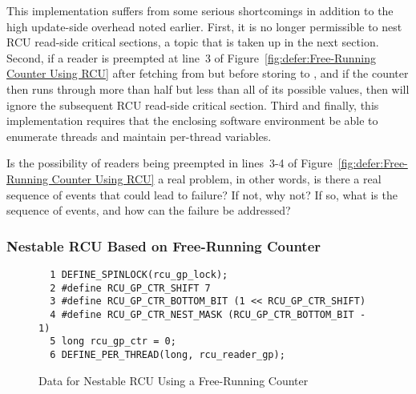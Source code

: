 This implementation suffers from some serious shortcomings in
addition to the high update-side overhead noted earlier.
First, it is no longer permissible to nest RCU read-side critical
sections, a topic that is taken up in the next section.
Second, if a reader is preempted at line~3 of
Figure~\ref{fig:defer:Free-Running Counter Using RCU} after fetching from
 but before storing to ,
and if the  counter then runs through more than half
but less than all of its possible values, then 
will ignore the subsequent RCU read-side critical section.
Third and finally, this implementation requires that the enclosing software
environment be able to enumerate threads and maintain per-thread
variables.

\QuickQuiz{}
	Is the possibility of readers being preempted in
	lines~3-4 of Figure~\ref{fig:defer:Free-Running Counter Using RCU}
	a real problem, in other words, is there a real sequence
	of events that could lead to failure?
	If not, why not?
	If so, what is the sequence of events, and how can the
	failure be addressed?
 \QuickQuizEnd

\subsubsection{Nestable RCU Based on Free-Running Counter}
\label{defer:Nestable RCU Based on Free-Running Counter}

\begin{figure}[tbp]
{ \scriptsize
\begin{verbatim}
  1 DEFINE_SPINLOCK(rcu_gp_lock);
  2 #define RCU_GP_CTR_SHIFT 7
  3 #define RCU_GP_CTR_BOTTOM_BIT (1 << RCU_GP_CTR_SHIFT)
  4 #define RCU_GP_CTR_NEST_MASK (RCU_GP_CTR_BOTTOM_BIT - 1)
  5 long rcu_gp_ctr = 0;
  6 DEFINE_PER_THREAD(long, rcu_reader_gp);
\end{verbatim}
}
\caption{Data for Nestable RCU Using a Free-Running Counter}
\label{fig:defer:Data for Nestable RCU Using a Free-Running Counter}
\end{figure}

